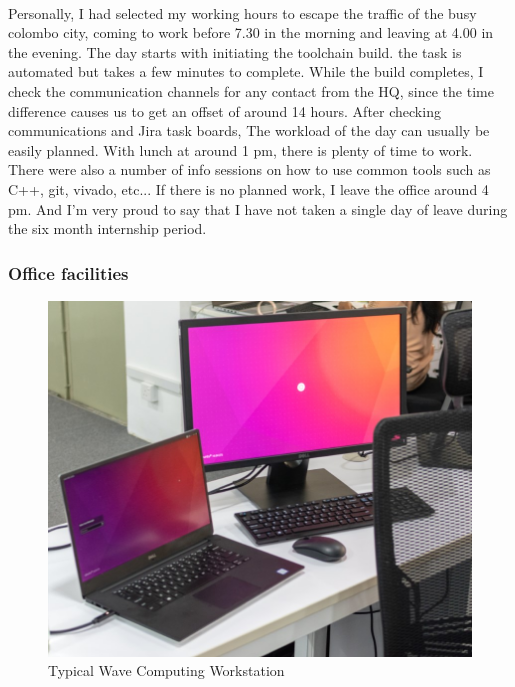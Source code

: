 \paragraph{}
Personally, I had selected my working hours to escape the traffic of the busy colombo city, coming to work before 7.30 in the morning and leaving at 4.00 in the evening. The day starts with initiating the toolchain build. the task is automated but takes a few minutes to complete. While the build completes, I check the communication channels for any contact from the HQ, since the time difference causes us to get an offset of around 14 hours. After checking communications and Jira task boards, The workload of the day can usually be easily planned. With lunch at around 1 pm, there is plenty of time to work. There were also a number of info sessions on how to use common tools such as C++, git, vivado, etc... If there is no planned work, I leave the office around 4 pm. And I'm very proud to say that I have not taken a single day of leave during the six month internship period.

\subsubsection{Office facilities}

\begin{figure}[H]
    \centering
    \includegraphics[trim=0cm 0cm 0cm 0cm, clip=true,scale=0.5]{figures/workstation.jpg}
    \caption{Typical Wave Computing Workstation\label{Fig:workstation}}\vspace{-4mm}
    \end{figure}


